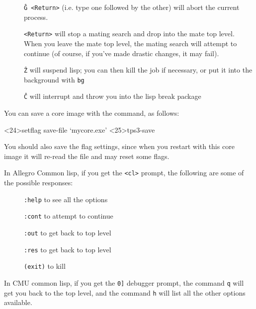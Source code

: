 \begin{description}
\item[] {\tt \^G <Return>} (i.e. type one followed by the other) will abort the current process.

\item[] {\tt <Return>} will stop a mating search and drop into the mate top level. When you
leave the mate top level, the mating search will attempt to continue (of course,
if you've made drastic changes, it may fail).

\item[] {\tt \^Z} will suspend lisp; you can then kill the job if necessary, or put it into
the background with {\tt bg}

\item[] {\tt \^C} will interrupt and throw you into the lisp break package
\end{description}

You can save a core image with the  command, as follows:

\begin{tpsexample}
<24>setflag save-file `mycore.exe'
<25>tps3-save
\end{tpsexample}

You should also save the flag settings, since when you restart {\TPS} with
this core image it will re-read the  file and may reset some flags.

In Allegro Common lisp, if you get the {\tt <cl>} prompt, the following are
some of the possible responses:

\begin{description}
\item[] {\tt :help} to see all the options

\item[] {\tt :cont} to attempt to continue

\item[] {\tt :out} to get back to top level

\item[] {\tt :res} to get back to top level

\item[] {\tt (exit)} to kill {\TPS}
\end{description}

In CMU common lisp, if you get the {\tt 0]} debugger prompt, the command
{\tt q} will get you back to the top level, and the command {\tt h} will
list all the other options available.

